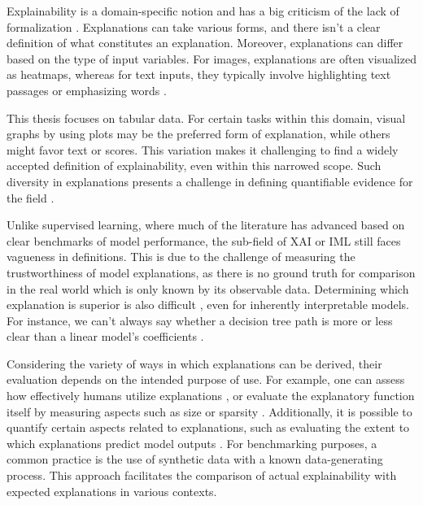 Explainability is a domain-specific notion and has a big criticism of the lack of formalization \cite{Rudin2019StopInstead,Watson2022ConceptualLearning,Lipton2018TheInterpretability}. Explanations can take various forms, and there isn't a clear definition of what constitutes an explanation. Moreover, explanations can differ based on the type of input variables. For images, explanations are often visualized as heatmaps, whereas for text inputs, they typically involve highlighting text passages or emphasizing words \cite{Molnar2022Model-agnosticLearning}.

This thesis focuses on tabular data. For certain tasks within this domain, visual graphs by using plots may be the preferred form of explanation, while others might favor text or scores. This variation makes it challenging to find a widely accepted definition of explainability, even within this narrowed scope. Such diversity in explanations presents a challenge in defining quantifiable evidence for the field \cite{Doshi-Velez2017TowardsLearning}. 

Unlike supervised learning, where much of the literature has advanced based on clear benchmarks of model performance, the sub-field of XAI or IML still faces vagueness in definitions. This is due to the challenge of measuring the trustworthiness of model explanations, as there is no ground truth for comparison in the real world which is only known by its observable data. Determining which explanation is superior is also difficult \cite{Arya2019OneTechniques}, even for inherently interpretable models. For instance, we can't always say whether a decision tree path is more or less clear than a linear model's coefficients \cite{Molnar2022Model-agnosticLearning}.

Considering the variety of ways in which explanations can be derived, their evaluation depends on the intended purpose of use. For example, one can assess how effectively humans utilize explanations \cite{Ehsan2021OperationalizingAI,Wang2019DesigningAI}, or evaluate the explanatory function itself by measuring aspects such as size or sparsity \cite{Yang2017ScalableLists, Ustun2016SupersparseSystems, Claassen2013LearningNP-hard}. Additionally, it is possible to quantify certain aspects related to explanations, such as evaluating the extent to which explanations predict model outputs \cite{Chen2022Use-Case-GroundedEvaluation, Lakkaraju2016InterpretableSets}. For benchmarking purposes, a common practice is the use of synthetic data with a known data-generating process. This approach facilitates the comparison of actual explainability with expected explanations in various contexts.

